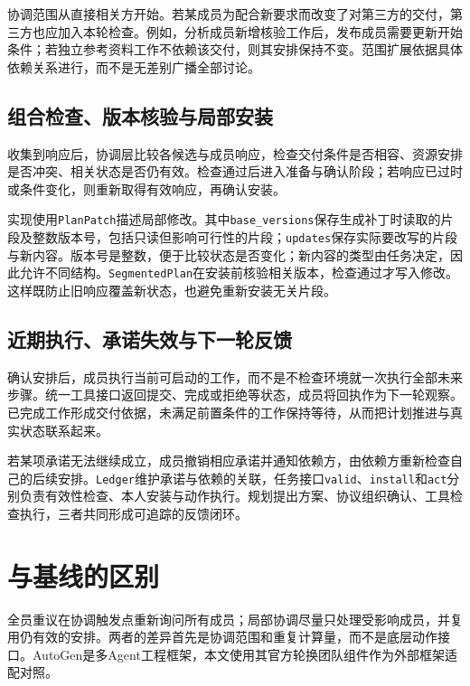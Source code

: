 协调范围从直接相关方开始。若某成员为配合新要求而改变了对第三方的交付，第三方也应加入本轮检查。例如，分析成员新增核验工作后，发布成员需要更新开始条件；若独立参考资料工作不依赖该交付，则其安排保持不变。范围扩展依据具体依赖关系进行，而不是无差别广播全部讨论。

\subsection{组合检查、版本核验与局部安装}

收集到响应后，协调层比较各候选与成员响应，检查交付条件是否相容、资源安排是否冲突、相关状态是否仍有效。检查通过后进入准备与确认阶段；若响应已过时或条件变化，则重新取得有效响应，再确认安装。

实现使用\texttt{PlanPatch}描述局部修改。其中\texttt{base\_versions}保存生成补丁时读取的片段及整数版本号，包括只读但影响可行性的片段；\texttt{updates}保存实际要改写的片段与新内容。版本号是整数，便于比较状态是否变化；新内容的类型由任务决定，因此允许不同结构。\texttt{SegmentedPlan}在安装前核验相关版本，检查通过才写入修改。这样既防止旧响应覆盖新状态，也避免重新安装无关片段。

\subsection{近期执行、承诺失效与下一轮反馈}

确认安排后，成员执行当前可启动的工作，而不是不检查环境就一次执行全部未来步骤。统一工具接口返回提交、完成或拒绝等状态，成员将回执作为下一轮观察。已完成工作形成交付依据，未满足前置条件的工作保持等待，从而把计划推进与真实状态联系起来。

若某项承诺无法继续成立，成员撤销相应承诺并通知依赖方，由依赖方重新检查自己的后续安排。\texttt{Ledger}维护承诺与依赖的关联，任务接口\texttt{valid}、\texttt{install}和\texttt{act}分别负责有效性检查、本人安装与动作执行。规划提出方案、协议组织确认、工具检查执行，三者共同形成可追踪的反馈闭环。

\hypertarget{ux4e0eux57faux7ebfux7684ux533aux522b}{%
\section{与基线的区别}\label{ux4e0eux57faux7ebfux7684ux533aux522b}}

全员重议在协调触发点重新询问所有成员；局部协调尽量只处理受影响成员，并复用仍有效的安排。两者的差异首先是协调范围和重复计算量，而不是底层动作接口。AutoGen是多Agent工程框架\cite{autogen}，本文使用其官方轮换团队组件作为外部框架适配对照。

